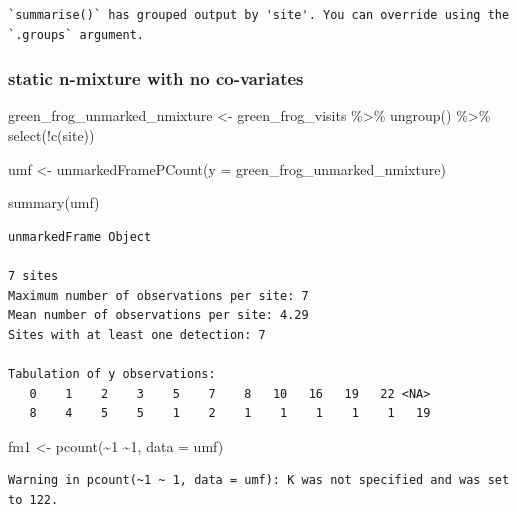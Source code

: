 \documentclass[
  letterpaper,
  DIV=11,
  numbers=noendperiod]{scrartcl}
\newenvironment{Shaded}{\begin{snugshade}}{\end{snugshade}}
\newcommand{\AttributeTok}[1]{\textcolor[rgb]{0.40,0.45,0.13}{#1}}
\newcommand{\DecValTok}[1]{\textcolor[rgb]{0.68,0.00,0.00}{#1}}
\newcommand{\FunctionTok}[1]{\textcolor[rgb]{0.28,0.35,0.67}{#1}}
\newcommand{\NormalTok}[1]{\textcolor[rgb]{0.00,0.23,0.31}{#1}}
\newcommand{\OtherTok}[1]{\textcolor[rgb]{0.00,0.23,0.31}{#1}}
\newcommand{\SpecialCharTok}[1]{\textcolor[rgb]{0.37,0.37,0.37}{#1}}
\begin{document}
\begin{verbatim}
`summarise()` has grouped output by 'site'. You can override using the
`.groups` argument.
\end{verbatim}

\hypertarget{static-n-mixture-with-no-co-variates}{%
\subsubsection{static n-mixture with no
co-variates}\label{static-n-mixture-with-no-co-variates}}

\begin{Shaded}
\begin{Highlighting}[]
\NormalTok{green\_frog\_unmarked\_nmixture }\OtherTok{\textless{}{-}}\NormalTok{ green\_frog\_visits }\SpecialCharTok{\%\textgreater{}\%} 
  \FunctionTok{ungroup}\NormalTok{() }\SpecialCharTok{\%\textgreater{}\%} 
  \FunctionTok{select}\NormalTok{(}\SpecialCharTok{!}\FunctionTok{c}\NormalTok{(site)) }


\NormalTok{umf }\OtherTok{\textless{}{-}} \FunctionTok{unmarkedFramePCount}\NormalTok{(}\AttributeTok{y =}\NormalTok{ green\_frog\_unmarked\_nmixture)}

\FunctionTok{summary}\NormalTok{(umf)}
\end{Highlighting}
\end{Shaded}

\begin{verbatim}
unmarkedFrame Object

7 sites
Maximum number of observations per site: 7 
Mean number of observations per site: 4.29 
Sites with at least one detection: 7 

Tabulation of y observations:
   0    1    2    3    5    7    8   10   16   19   22 <NA> 
   8    4    5    5    1    2    1    1    1    1    1   19 
\end{verbatim}

\begin{Shaded}
\begin{Highlighting}[]
\NormalTok{fm1 }\OtherTok{\textless{}{-}} \FunctionTok{pcount}\NormalTok{(}\SpecialCharTok{\textasciitilde{}}\DecValTok{1} \SpecialCharTok{\textasciitilde{}}\DecValTok{1}\NormalTok{, }\AttributeTok{data =}\NormalTok{ umf)}
\end{Highlighting}
\end{Shaded}

\begin{verbatim}
Warning in pcount(~1 ~ 1, data = umf): K was not specified and was set to 122.
\end{verbatim}
\end{document}
